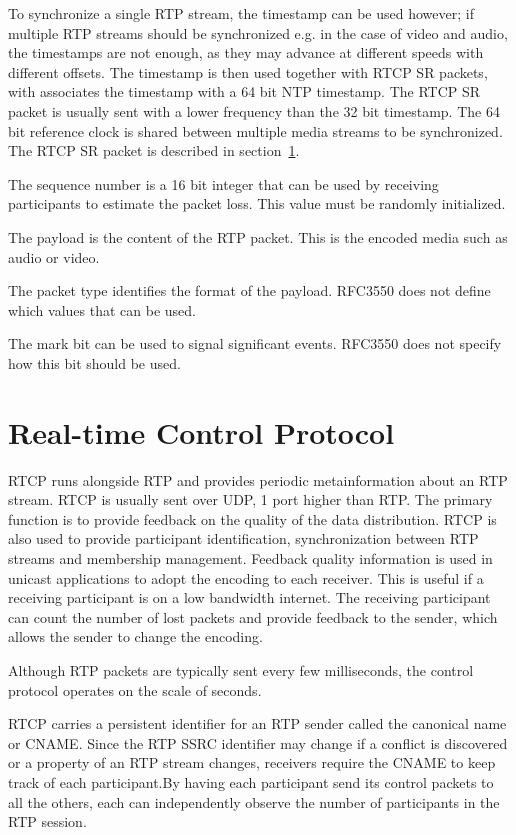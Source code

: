 To synchronize a single RTP stream, the timestamp can be used however; if multiple RTP streams should be synchronized e.g. in the case of video and audio, the timestamps are not enough, as they may advance at different speeds with different offsets. The timestamp is then used together with RTCP SR packets, with associates the timestamp with a 64 bit NTP timestamp. The RTCP SR packet is usually sent with a lower frequency than the 32 bit timestamp. The 64 bit reference clock is shared between multiple media streams to be synchronized. The RTCP SR packet is described in section~\ref{sec:design:rtcp}.


The sequence number is a 16 bit integer that can be used by receiving participants to estimate the packet loss. This value must be randomly initialized.

The payload is the content of the RTP packet. This is the encoded media such as audio or video. 

The packet type identifies the format of the payload. RFC3550 does not define which values that can be used.


The mark bit can be used to signal significant events. RFC3550 does not specify how this bit should be used.



\section{Real-time Control Protocol} \label{sec:design:rtcp}
RTCP runs alongside RTP and provides periodic metainformation about an RTP stream. RTCP is usually sent over UDP, 1 port higher than RTP. The primary function is to provide feedback on the quality of the data distribution. RTCP is also used to provide participant identification, synchronization between RTP streams and membership management. Feedback quality information is used in unicast applications to adopt the encoding to each receiver. This is useful if a receiving participant is on a low bandwidth internet. The receiving participant can count the number of lost packets and provide feedback to the sender, which allows the sender to change the encoding.

Although RTP packets are typically sent every few milliseconds, the control protocol operates on the scale of seconds.


RTCP carries a persistent identifier for an RTP sender called the canonical name or CNAME. Since the RTP SSRC identifier may change if a conflict is discovered or a property of an RTP stream changes, receivers require the CNAME to keep track of each participant.By having each participant send its control packets to all the others, each can independently observe the number of participants in the RTP session.


